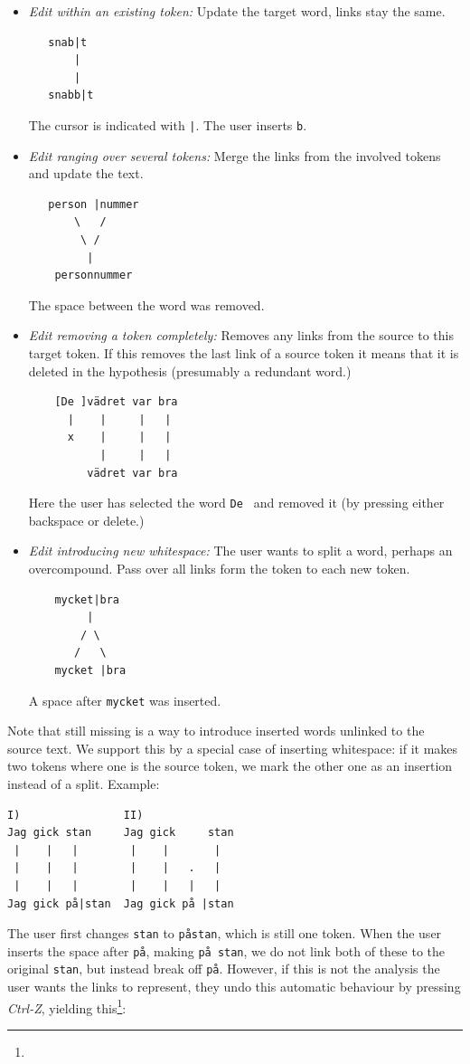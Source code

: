 \documentclass[10pt, a4paper]{article}
\newcommand{\dan}[1]{{\color{Fuchsia}{Dan: #1}}}
\begin{document}
\begin{itemize}

\item {\it Edit within an existing token:}
Update the target word, links stay the same.
\begin{verbatim}
   snab|t
       |
       |
   snabb|t
\end{verbatim}
The cursor is indicated with \verb!|!. The user inserts \verb!b!.

\item {\it Edit ranging over several tokens:}
Merge the links from the involved tokens and update the text.
\begin{verbatim}
   person |nummer
       \   /
        \ /
         |
    personnummer
\end{verbatim}
The space between the word was removed.

\item {\it Edit removing a token completely:}
Removes any links from the source to this target token.
If this removes the last link of a source token it means that
it is deleted in the hypothesis (presumably a redundant word.)
\begin{verbatim}
    [De ]vädret var bra
      |    |     |   |
      x    |     |   |
           |     |   |
         vädret var bra
\end{verbatim}
Here the user has selected the word \verb!De ! and removed it
(by pressing either backspace or delete.)

\item {\it Edit introducing new whitespace:}
The user wants to split a word, perhaps an overcompound.
Pass over all links form the token to each new token.
\begin{verbatim}
    mycket|bra
         |
        / \
       /   \
    mycket |bra
\end{verbatim}
A space after \verb!mycket! was inserted.
\end{itemize}

Note that still missing is a way to introduce inserted words
unlinked to the source text. We support this by a special case of
inserting whitespace: if it makes two tokens where one is the source
token, we mark the other one as an insertion instead of a split. Example:

\begin{verbatim}
I)                II)
Jag gick stan     Jag gick     stan
 |    |   |        |    |       |
 |    |   |        |    |   .   |
 |    |   |        |    |   |   |
Jag gick på|stan  Jag gick på |stan
\end{verbatim}
The user first changes \verb!stan! to \verb!påstan!, which is still one token.
When the user inserts the space after \verb!på!, making \verb!på stan!, we do
not link both of these to the original \verb!stan!,
but instead break off \verb!på!.
However, if this is not the analysis the user wants the links to represent,
they undo this automatic behaviour by pressing {\it Ctrl-Z},
yielding this\footnote{\dan{Not yet in the interface, but the fix is minuscule.}}:
\end{document}

